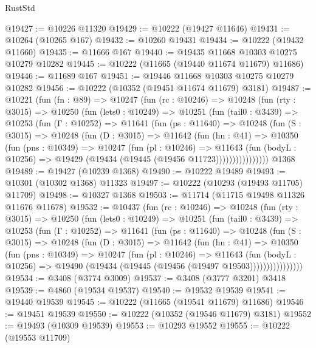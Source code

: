 \begin{lexlean}{RustStd}
\begin{coremodule}
@19427 := @10226 @11320
@19429 := @10222 (@19427 @11646)
@19431 := @10264 (@10265 @167)
@19432 := @10260 @19431
@19434 := @10222 (@19432 @11660)
@19435 := @11666 @167
@19440 := @19435 @11668 @10303 @10275 @10279 @10282
@19445 := @10222 (@11665 (@19440 @11674 @11679) @11686)
@19446 := @11689 @167
@19451 := @19446 @11668 @10303 @10275 @10279 @10282
@19456 := @10222 (@10352 (@19451 @11674 @11679) @3181)
@19487 := @10221
    (fun (fn : @89) =>
    @10247
      (fun (rc : @10246) =>
      @10248
        (fun (rty : @3015) =>
        @10250
          (fun (lets0 : @10249) =>
          @10251
            (fun (tail0 : @3439) =>
            @10253
              (fun (Γ : @10252) =>
              @11641
                (fun (ps : @11640) =>
                @10248
                  (fun (S : @3015) =>
                  @10248
                    (fun (D : @3015) =>
                    @11642
                      (fun (hn : @41) =>
                      @10350
                        (fun (pns : @10349) =>
                        @10247
                          (fun (pl : @10246) =>
                          @11643
                            (fun (bodyL : @10256) =>
                            @19429 (@19434 (@19445 (@19456 @11723))))))))))))))))
    @1368
@19489 := @19427 (@10239 @1368)
@19490 := @10222 @19489
@19493 := @10301 (@10302 @1368) @11323
@19497 := @10222 (@10293 (@19493 @11705) @11709)
@19498 := @10327 @1368
@19503 := @11714 (@11715 @19498 @11326 @11676 @11678)
@19532 := @10437
    (fun (rc : @10246) =>
    @10248
      (fun (rty : @3015) =>
      @10250
        (fun (lets0 : @10249) =>
        @10251
          (fun (tail0 : @3439) =>
          @10253
            (fun (Γ : @10252) =>
            @11641
              (fun (ps : @11640) =>
              @10248
                (fun (S : @3015) =>
                @10248
                  (fun (D : @3015) =>
                  @11642
                    (fun (hn : @41) =>
                    @10350
                      (fun (pns : @10349) =>
                      @10247
                        (fun (pl : @10246) =>
                        @11643
                          (fun (bodyL : @10256) =>
                          @19490 (@19434 (@19445 (@19456 (@19497 @19503))))))))))))))))
@19534 := @3408 (@3774 @3009)
@19537 := @3408 (@3777 @3201) @3418
@19539 := @4860 (@19534 @19537)
@19540 := @19532 @19539
@19541 := @19440 @19539
@19545 := @10222 (@11665 (@19541 @11679) @11686)
@19546 := @19451 @19539
@19550 := @10222 (@10352 (@19546 @11679) @3181)
@19552 := @19493 (@10309 @19539)
@19553 := @10293 @19552
@19555 := @10222 (@19553 @11709)

\end{coremodule}
\end{lexlean}

